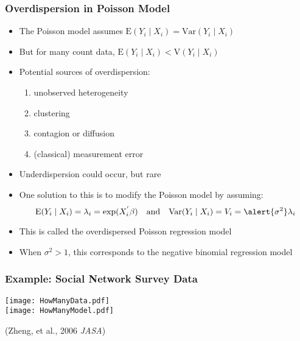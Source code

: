 \documentclass{beamer}
\begin{document}
\begin{frame}
  \frametitle{Overdispersion in Poisson Model}

  \begin{itemize}
  \item The Poisson model assumes $\text{E}(Y_i\mid X_i) = \text{Var}(Y_i\mid X_i)$
  \item But for many count data, $\text{E}(Y_i\mid X_i) < \text{V}(Y_i\mid X_i)$
\pause
  \item Potential sources of overdispersion:
    \begin{enumerate}
    \item unobserved heterogeneity
    \item clustering
    \item contagion or diffusion
    \item (classical) measurement error
    \end{enumerate}

\pause
  \item Underdispersion could occur, but rare

\medskip
\pause
  \item One solution to this is to modify the Poisson model by assuming:
    $$ \text{E}(Y_i\mid X_i) = \lambda_i = \exp(X_i^{'}\beta) \quad \text{and} \quad
    \text{Var}(Y_i\mid X_i) = V_i = \alert{\sigma^2}\lambda_i $$
  \item This is called the \alert{overdispersed Poisson regression} model
\pause
  \item When $\sigma^2 > 1$, this corresponds to  the
   negative binomial regression model
  \end{itemize}

\end{frame}

\begin{frame}
\frametitle{Example: Social Network Survey Data}

\begin{center}
  \texttt{[image: HowManyData.pdf]}\\
  \texttt{[image: HowManyModel.pdf]}
\end{center}
\flushright(Zheng, et al., 2006 {\it JASA})


\end{frame}
\end{document}
